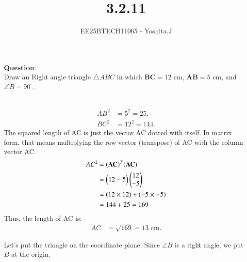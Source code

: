\documentclass[journal]{IEEEtran}
\begin{document}

\vspace{3cm}

\title{3.2.11}
\author{EE25BTECH11065 - Yoshita.J}
{\let\newpage\relax\maketitle}

\renewcommand{\thefigure}{\theenumi}
\renewcommand{\thetable}{\theenumi}
\setlength{\intextsep}{10pt} %


\renewcommand{\thetable}{\theenumi}


\textbf{Question}:\\
Draw an Right angle  triangle $\triangle ABC$ in which $\boldsymbol{BC} = 12 \text{ cm}$, $\boldsymbol{AB} = 5 \text{ cm}$, and $\angle B = 90^\circ$.
\\ \solution \\
    \begin{table}[h!]    
      \centering
      
      \caption{}
    \end{table}
   \begin{align}
      AB^2 & = 5^2 = 25, \\
      BC^2 & = 12^2 = 144.
   \end{align}
   The squared length of AC is just the vector AC dotted with itself. In matrix form, that means multiplying the row vector (transpose) of AC with the column vector AC.
   \begin{align}
    AC^2 &= (\mathbf{AC})^T (\mathbf{AC}) \\
         &= \begin{pmatrix}12 -5\end{pmatrix} \begin{pmatrix}12 \\ -5\end{pmatrix} \\
         &= (12 \times 12) + (-5 \times -5) \\
         &= 144 + 25 = 169
\end{align}
Thus, the length of AC is:
\begin{align}
    AC &= \sqrt{169} = 13 \text{ cm}.
\end{align}
\newpage{}

Let's put the triangle on the coordinate plane.  
Since $\angle B$ is a right angle, we put $B$ at the origin.  \\
\end{document}
